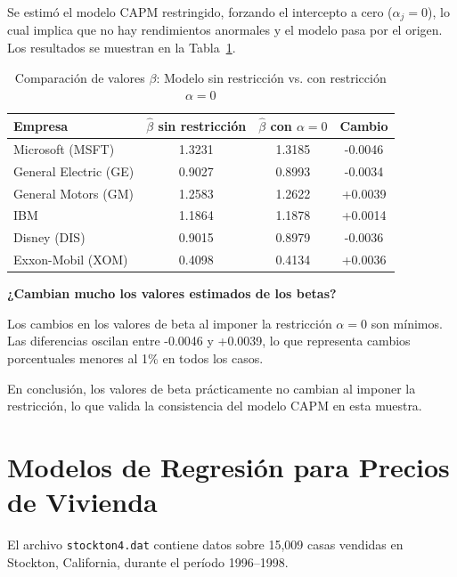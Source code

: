 \documentclass[12pt]{article}
\begin{document}


Se estimó el modelo CAPM restringido, forzando el intercepto a cero ($\alpha_j = 0$), lo cual implica que no hay rendimientos anormales y el modelo pasa por el origen. Los resultados se muestran en la Tabla~\ref{tab:capm_comparison}.

\begin{table}[h!]
\centering
\caption{Comparación de valores $\beta$: Modelo sin restricción vs. con restricción $\alpha = 0$}
\label{tab:capm_comparison}
\begin{tabular}{lccc}
\hline
\textbf{Empresa} & \textbf{$\hat{\beta}$ sin restricción} & \textbf{$\hat{\beta}$ con $\alpha = 0$} & \textbf{Cambio} \\
\hline
Microsoft (MSFT)      & 1.3231 & 1.3185 & -0.0046 \\
General Electric (GE) & 0.9027 & 0.8993 & -0.0034 \\
General Motors (GM)   & 1.2583 & 1.2622 & +0.0039 \\
IBM                   & 1.1864 & 1.1878 & +0.0014 \\
Disney (DIS)          & 0.9015 & 0.8979 & -0.0036 \\
Exxon-Mobil (XOM)     & 0.4098 & 0.4134 & +0.0036 \\
\hline
\end{tabular}
\end{table}

\textbf{¿Cambian mucho los valores estimados de los betas?}

Los cambios en los valores de beta al imponer la restricción $\alpha = 0$ son mínimos. Las diferencias oscilan entre -0.0046 y +0.0039, lo que representa cambios porcentuales menores al 1\% en todos los casos.

En conclusión, los valores de beta prácticamente no cambian al imponer la restricción, lo que valida la consistencia del modelo CAPM en esta muestra.

\section{Modelos de Regresión para Precios de Vivienda}

El archivo \texttt{stockton4.dat} contiene datos sobre 15,009 casas vendidas en Stockton, California, durante el período 1996--1998. 
\end{document}
